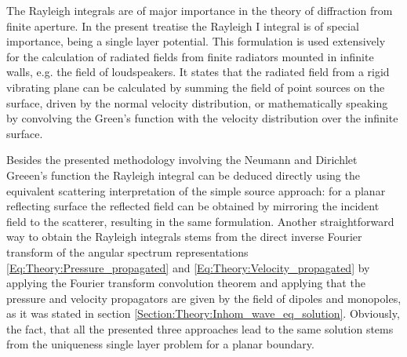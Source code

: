 The Rayleigh integrals are of major importance in the theory of diffraction from finite aperture.
In the present treatise the Rayleigh I integral is of special importance, being a single layer potential.
This formulation is used extensively for the calculation of radiated fields from finite radiators mounted in infinite walls, e.g. the field of loudspeakers.
It states that the radiated field from a rigid vibrating plane can be calculated by summing the field of point sources on the surface, driven by the normal velocity distribution, or mathematically speaking by convolving the Green's function with the velocity distribution over the infinite surface.

\vspace{3mm}
Besides the presented methodology involving the Neumann and Dirichlet Greeen's function the Rayleigh integral can be deduced directly using the equivalent scattering interpretation of the simple source approach: for a planar reflecting surface the reflected field can be obtained by mirroring the incident field to the scatterer, resulting in the same formulation.
Another straightforward way to obtain the Rayleigh integrals stems from the direct inverse Fourier transform of the angular spectrum representations \eqref{Eq:Theory:Pressure_propagated} and \eqref{Eq:Theory:Velocity_propagated} by applying the Fourier transform convolution theorem and applying that the pressure and velocity propagators are given by the field of dipoles and monopoles, as it was stated in section \ref{Section:Theory:Inhom_wave_eq_solution}.
Obviously, the fact, that all the presented three approaches lead to the same solution stems from the uniqueness single layer problem for a planar boundary.